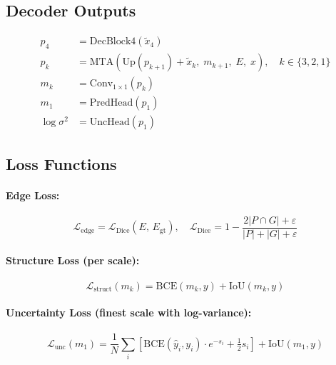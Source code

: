 \documentclass[12pt,a4paper]{report}
\begin{document}
\subsection{Decoder Outputs}

\begin{align}
  p_4 &= \text{DecBlock4}(\tilde{x}_4) \label{eq:p4}\\
  p_k &= \text{MTA}\!\left(\text{Up}(p_{k+1}) + \tilde{x}_k,\; m_{k+1},\; E,\; x\right),\quad k\in\{3,2,1\} \label{eq:pk}\\
  m_k &= \text{Conv}_{1\times1}(p_k) \label{eq:mk}\\
  m_1 &= \text{PredHead}(p_1) \label{eq:m1main}\\
  \log\sigma^2 &= \text{UncHead}(p_1) \label{eq:logvar}
\end{align}

\subsection{Loss Functions}

\paragraph{Edge Loss:}
\begin{equation}
  \mathcal{L}_{\text{edge}} = \mathcal{L}_{\text{Dice}}(E,\, E_{\text{gt}}),\quad
  \mathcal{L}_{\text{Dice}} = 1 - \frac{2|P \cap G| + \varepsilon}{|P| + |G| + \varepsilon}
  \label{eq:edgeloss}
\end{equation}

\paragraph{Structure Loss (per scale):}
\begin{equation}
  \mathcal{L}_{\text{struct}}(m_k) = \text{BCE}(m_k, y) + \text{IoU}(m_k, y)
  \label{eq:structloss}
\end{equation}

\paragraph{Uncertainty Loss (finest scale with log-variance):}
\begin{equation}
  \mathcal{L}_{\text{unc}}(m_1) = \frac{1}{N}\sum_i \left[
    \text{BCE}(\hat{y}_i, y_i)\cdot e^{-s_i} + \tfrac{1}{2}s_i
  \right] + \text{IoU}(m_1, y)
  \label{eq:uncloss}
\end{equation}
\end{document}
